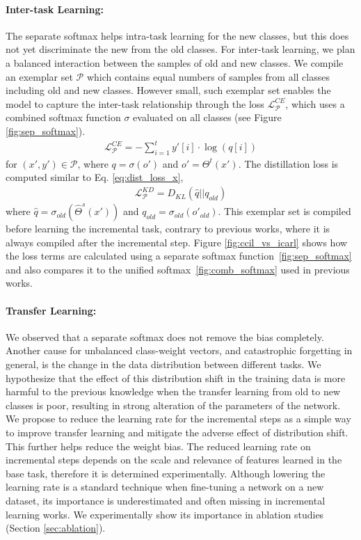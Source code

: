 \documentclass[final]{cvpr}
\begin{document}
\paragraph{Inter-task Learning:}
The separate softmax helps intra-task learning for the new classes, but this does not yet discriminate the new from the old classes. For inter-task learning, we plan a balanced interaction between the samples of old and new classes. We compile an exemplar set $\mathcal{P}$ which contains equal numbers of samples from all classes including old and new classes. However small, such exemplar set enables the model to capture the inter-task relationship through the loss $\mathcal{L}^{CE}_{\mathcal{P}}$, which uses a combined softmax function $\sigma$ evaluated on all classes (see Figure \ref{fig:sep_softmax}). \begin{align}
    \mathcal{L}^{CE}_{\mathcal{P}} = -\sum_{i=1}^t y'[i]\cdot \log(q[i])  \label{eq:cls_loss_p}
\end{align}
for $(x',y')\in \mathcal{P}$, where $q = \sigma(o')$ and $o' = \Theta^t(x')$. The distillation loss is computed similar to Eq. \ref{eq:dist_loss_x},
\begin{align}
    \mathcal{L}^{KD}_{\mathcal{P}} = D_{KL}( {\hat{q}||q_{old}}) \label{eq:dist_loss_p}
\end{align}
where $\hat{q} = \sigma_{old}(\hat{\Theta}^s(x'))$ and $q_{old} = \sigma_{old}(o'_{old})$. This exemplar set is compiled before learning the incremental task, contrary to previous works, where it is always compiled after the incremental step. Figure \ref{fig:ccil_vs_icarl} shows how the loss terms are calculated using a separate softmax function~\ref{fig:sep_softmax} and also compares it to the unified softmax~\ref{fig:comb_softmax} used in previous works. 

\paragraph{Transfer Learning:}
We observed that a separate softmax does not remove the bias completely. Another cause for unbalanced class-weight vectors, and catastrophic forgetting in general, is the change in the data distribution between different tasks. We hypothesize that the effect of this distribution shift in the training data is more harmful to the previous knowledge when the transfer learning from old to new classes is poor, resulting in strong alteration of the parameters of the network. 
We propose to reduce the learning rate for the incremental steps as a simple way to improve transfer learning and mitigate the adverse effect of distribution shift. This further helps reduce the weight bias. The reduced learning rate on incremental steps depends on the scale and relevance of features learned in the base task, therefore it is determined experimentally.
Although lowering the learning rate is a standard technique when fine-tuning a network on a new dataset, its importance is underestimated and often missing in incremental learning works. We experimentally show its importance in ablation studies (Section \ref{sec:ablation}). 
\end{document}
